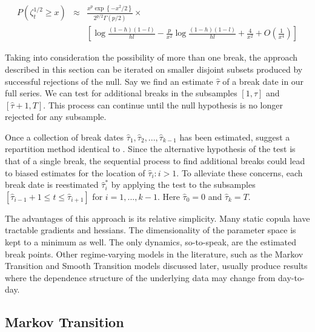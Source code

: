 \begin{eqnarray}
P\left(\zeta_{t}^{1/2} \geq x\right) &\approx& \frac{x^{p} \exp\left\{-x^{2}/2\right\}}{2^{p/2}\Gamma \left(p/2\right)} \times  \\
                                 && \left[\log \frac{\left(1-h\right) \left(1-l\right)}{hl} - \frac{p}{x^{2}}\log \frac{\left(1-h\right)\left(1-l\right)}{hl} + \frac{4}{x^{2}} + O \left(\frac{1}{x^{4}}\right)\right]
\end{eqnarray}

Taking into consideration the possibility of more than one break, the approach described in this section can be iterated on smaller disjoint subsets produced by successful rejections of the null. Say we find an estimate $\hat{\tau}$ of a break date in our full series. We can test for additional breaks in the subsamples $\left[1, \hat{\tau}\right]$ and $\left[\hat{\tau} + 1, T\right]$. This process can continue until the null hypothesis is no longer rejected for any subsample.

Once a collection of break dates $\hat{\tau}_{1},\hat{\tau}_{2},...,\hat{\tau}_{k-1}$ has been estimated, \cite{Dias_and_Embrechts_2009} suggest a repartition method identical to \cite{Bai_1997}. Since the alternative hypothesis of the test is that of a single break, the sequential process to find additional breaks could lead to biased estimates for the location of $\hat{\tau}_{i}:i > 1$. To alleviate these concerns, each break date is reestimated $\hat{\tau}_{i}^{\ast}$ by applying the test to the subsamples $\left[ \hat{\tau}_{i-1}+1\leq t\leq \hat{\tau}_{i+1}\right]$ for $i=1,...,k-1$. Here $\hat{\tau}_{0} = 0$ and $\hat{\tau}_{k} = T$.

The advantages of this approach is its relative simplicity. Many static copula have tractable gradients and hessians. The dimensionality of the parameter space is kept to a minimum as well. The only dynamics, so-to-speak, are the estimated break points. Other regime-varying models in the literature, such as the Markov Transition and Smooth Transition models discussed later, usually produce results where the dependence structure of the underlying data may change from day-to-day.

\subsection{Markov Transition}

